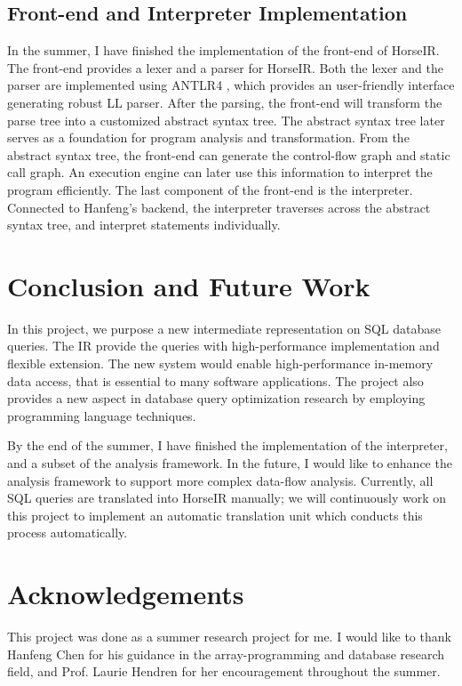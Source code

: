 \documentclass[sigplan]{acmart}
\begin{document}
\subsection*{Front-end and Interpreter Implementation}
In the summer, I have finished the implementation of the front-end of HorseIR.
The front-end provides a lexer and a parser for HorseIR. Both the lexer and the
parser are implemented using ANTLR4\cite{ANTLRHome} , which provides an
user-friendly interface generating robust LL parser. After the parsing, the
front-end will transform the parse tree into a customized abstract syntax tree.
The abstract syntax tree later serves as a foundation for program analysis and
transformation. From the abstract syntax tree, the front-end can generate the
control-flow graph and static call graph. An execution engine can later use
this information to interpret the program efficiently. The last component of
the front-end is the interpreter. Connected to Hanfeng's backend, the
interpreter traverses across the abstract syntax tree, and interpret statements
individually.

\section{Conclusion and Future Work}

In this project, we purpose a new intermediate representation on SQL database
queries. The IR provide the queries with high-performance implementation and
flexible extension. The new system would enable high-performance in-memory data
access, that is essential to many software applications. The project also
provides a new aspect in database query optimization research by employing
programming language techniques. 

By the end of the summer, I have finished the implementation of the
interpreter, and a subset of the analysis framework. In the future, I would
like to enhance the analysis framework to support more complex data-flow
analysis. Currently, all SQL queries are translated into HorseIR manually; we
will continuously work on this project to implement an automatic translation
unit which conducts this process automatically.

\section*{Acknowledgements}
This project was done as a summer research project for me. I would like to
thank Hanfeng Chen for his guidance in the array-programming and database
research field, and Prof. Laurie Hendren for her encouragement throughout the
summer. 



\end{document}
